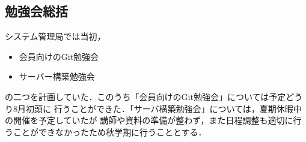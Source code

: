 \subsection*{勉強会総括}


システム管理局では当初，

\begin{itemize}
    \item 会員向けのGit勉強会
    \item サーバー構築勉強会
\end{itemize}

の二つを計画していた．このうち「会員向けのGit勉強会」については予定どうり8月初頭に
行うことができた．「サーバ構築勉強会」については，夏期休暇中の開催を予定していたが
講師や資料の準備が整わず，また日程調整も適切に行うことができなかったため秋学期に行うこととする．

